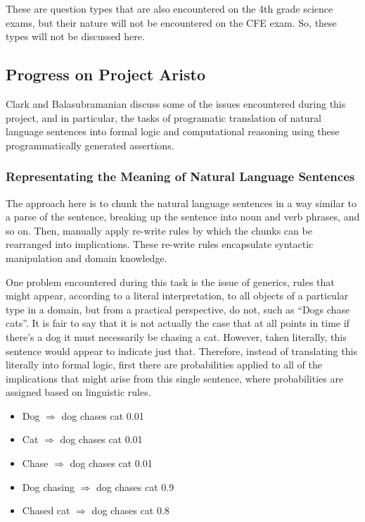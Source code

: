 These are question types that are also encountered on the 4th grade science exams, but their nature will not be encountered on the CFE exam.  So, these types will not be discussed here.

\subsection{Progress on Project Aristo}

Clark and Balasubramanian \cite{clark2014interpreting} discuss some of the 
issues encountered during this project, and in particular, the tasks of programatic 
translation of natural language sentences into formal logic and computational 
reasoning using these programmatically generated assertions.

\subsubsection{Representating the Meaning of Natural Language Sentences}

The approach here is to chunk the natural language sentences in a way similar to a parse of the sentence, breaking up the sentence into noun and verb phrases, and so on.  Then, manually apply re-write rules by which the chunks can be rearranged into implications.  These re-write rules encapsulate syntactic manipulation and domain knowledge.

One problem encountered during this task is the issue of generics, rules that might appear, according to a literal interpretation, to all objects of a particular type in a domain, but from a practical perspective, do not, such as ``Dogs chase cats”.  It is fair to say that it is not actually the case that at all points in time if there’s a dog it must necessarily be chasing a cat.  However, taken literally, this sentence would appear to indicate just that.  Therefore, instead of translating this literally into formal logic, first there are probabilities applied to all of the implications that might arise from this single sentence, where probabilities are assigned based on linguistic rules.

\begin{itemize}
\item Dog $\Rightarrow$ dog chases cat 0.01
\item Cat $\Rightarrow$ dog chases cat 0.01
\item Chase $\Rightarrow$ dog chases cat 0.01
\item Dog chasing $\Rightarrow$ dog chases cat 0.9
\item Chased cat $\Rightarrow$ dog chases cat 0.8 \cite{clark2015elementary}
\end{itemize}

